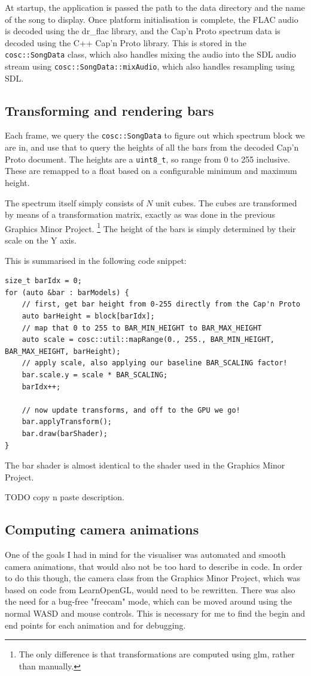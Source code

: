 \documentclass[11pt]{article}
\begin{document}
At startup, the application is passed the path to the data directory and the name of the song to display. Once
platform initialisation is complete, the FLAC audio is decoded using the dr\_flac library, and the Cap'n Proto
spectrum data is decoded using the C++ Cap'n Proto library. This is stored in the \verb|cosc::SongData| class,
which also handles mixing the audio into the SDL audio stream using \verb|cosc::SongData::mixAudio|, which
also handles resampling using SDL.

\subsection{Transforming and rendering bars}
Each frame, we query the \verb|cosc::SongData| to figure out which spectrum block we are in, and use that to
query the heights of all the bars from the decoded Cap'n Proto document. The heights are a \verb|uint8_t|, so
range from 0 to 255 inclusive. These are remapped to a float based on a configurable minimum and maximum
height.

The spectrum itself simply consists of $N$ unit cubes. The cubes are transformed by means of a transformation
matrix, exactly as was done in the previous Graphics Minor Project. \footnote{The only difference is that
transformations are computed using glm, rather than manually.} The height of the bars is simply determined by
their scale on the Y axis.

This is summarised in the following code snippet:

\begin{verbatim}
size_t barIdx = 0;
for (auto &bar : barModels) {
    // first, get bar height from 0-255 directly from the Cap'n Proto
    auto barHeight = block[barIdx];
    // map that 0 to 255 to BAR_MIN_HEIGHT to BAR_MAX_HEIGHT
    auto scale = cosc::util::mapRange(0., 255., BAR_MIN_HEIGHT, BAR_MAX_HEIGHT, barHeight);
    // apply scale, also applying our baseline BAR_SCALING factor!
    bar.scale.y = scale * BAR_SCALING;
    barIdx++;

    // now update transforms, and off to the GPU we go!
    bar.applyTransform();
    bar.draw(barShader);
}
\end{verbatim}

The bar shader is almost identical to the shader used in the Graphics Minor Project.

TODO copy n paste description.

\subsection{Computing camera animations}
One of the goals I had in mind for the visualiser was automated and smooth camera animations, that would also
not be too hard to describe in code. In order to do this though, the camera class from the Graphics Minor
Project, which was based on code from LearnOpenGL, would need to be rewritten. There was also the need for a
bug-free "freecam" mode, which can be moved around using the normal WASD and mouse controls. This is necessary
for me to find the begin and end points for each animation and for debugging.
\end{document}
